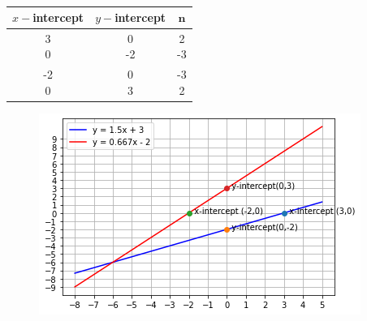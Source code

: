 \documentclass[journal,12pt,twocolumn]{IEEEtran}
\begin{document}
\begin{table}[htbp]
	\centering
	\begin{tabular}{|c|c|c|} \hline 
	$x-$intercept & $y-$intercept & \quad $\mathbf{n}$  \\ \hline \hline
	\myvec{3\\0}	&	\myvec{0\\-2}	&	\myvec{2\\-3} \\ \hline
	\myvec{-2\\0}	&	\myvec{0\\3}	&	\myvec{-3\\2} \\ \hline
	\end{tabular}
	\caption{} \label{coeftable}
\end{table}
\begin{figure}[!h]
\includegraphics[width=\columnwidth]{stline_plot.png}
	\caption{}  \label{linefig1} 
\end{figure}
\end{document}
